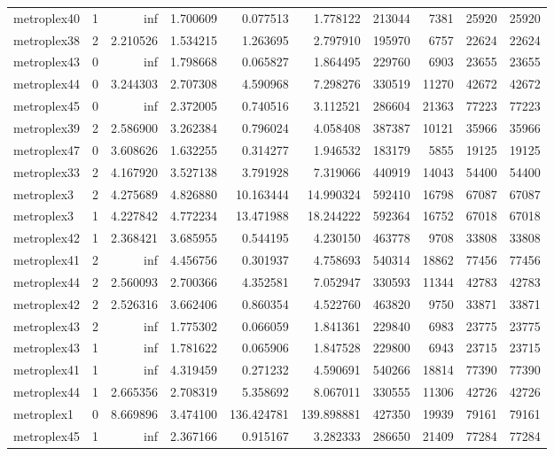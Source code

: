 \documentclass[../../../thesis.tex]{subfiles}
\begin{document}
\begin{longtable}{|l|r|r|r|r|r|r|r|r|r|}
metroplex40 & 1 & inf & 1.700609 & 0.077513 & 1.778122 & 213044 & 7381 & 25920 & 25920 \\
metroplex38 & 2 & 2.210526 & 1.534215 & 1.263695 & 2.797910 & 195970 & 6757 & 22624 & 22624 \\
metroplex43 & 0 & inf & 1.798668 & 0.065827 & 1.864495 & 229760 & 6903 & 23655 & 23655 \\
metroplex44 & 0 & 3.244303 & 2.707308 & 4.590968 & 7.298276 & 330519 & 11270 & 42672 & 42672 \\
metroplex45 & 0 & inf & 2.372005 & 0.740516 & 3.112521 & 286604 & 21363 & 77223 & 77223 \\
metroplex39 & 2 & 2.586900 & 3.262384 & 0.796024 & 4.058408 & 387387 & 10121 & 35966 & 35966 \\
metroplex47 & 0 & 3.608626 & 1.632255 & 0.314277 & 1.946532 & 183179 & 5855 & 19125 & 19125 \\
metroplex33 & 2 & 4.167920 & 3.527138 & 3.791928 & 7.319066 & 440919 & 14043 & 54400 & 54400 \\
metroplex3 & 2 & 4.275689 & 4.826880 & 10.163444 & 14.990324 & 592410 & 16798 & 67087 & 67087 \\
metroplex3 & 1 & 4.227842 & 4.772234 & 13.471988 & 18.244222 & 592364 & 16752 & 67018 & 67018 \\
metroplex42 & 1 & 2.368421 & 3.685955 & 0.544195 & 4.230150 & 463778 & 9708 & 33808 & 33808 \\
metroplex41 & 2 & inf & 4.456756 & 0.301937 & 4.758693 & 540314 & 18862 & 77456 & 77456 \\
metroplex44 & 2 & 2.560093 & 2.700366 & 4.352581 & 7.052947 & 330593 & 11344 & 42783 & 42783 \\
metroplex42 & 2 & 2.526316 & 3.662406 & 0.860354 & 4.522760 & 463820 & 9750 & 33871 & 33871 \\
metroplex43 & 2 & inf & 1.775302 & 0.066059 & 1.841361 & 229840 & 6983 & 23775 & 23775 \\
metroplex43 & 1 & inf & 1.781622 & 0.065906 & 1.847528 & 229800 & 6943 & 23715 & 23715 \\
metroplex41 & 1 & inf & 4.319459 & 0.271232 & 4.590691 & 540266 & 18814 & 77390 & 77390 \\
metroplex44 & 1 & 2.665356 & 2.708319 & 5.358692 & 8.067011 & 330555 & 11306 & 42726 & 42726 \\
metroplex1 & 0 & 8.669896 & 3.474100 & 136.424781 & 139.898881 & 427350 & 19939 & 79161 & 79161 \\
metroplex45 & 1 & inf & 2.367166 & 0.915167 & 3.282333 & 286650 & 21409 & 77284 & 77284 \\

\end{longtable}
\end{document}
